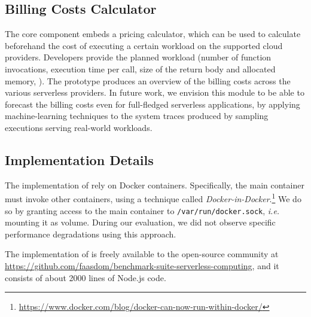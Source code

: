 
\subsection{Billing Costs Calculator}\label{ssec:billingcalc}

The core component embeds a pricing calculator, which can be used to calculate beforehand the cost of executing a certain workload on the supported cloud providers. 
Developers provide the planned workload (\eg number of function invocations, execution time per call, size of the return body and allocated memory, \etc).
The \sys prototype produces an overview of the billing costs across the various serverless providers.
In future work, we envision this module to be able to forecast the billing costs even for full-fledged serverless applications, by applying machine-learning techniques to the system traces produced by sampling executions serving real-world workloads.

\subsection{Implementation Details}\label{ssec:impl}
The implementation of \sys rely on Docker containers.
Specifically, the main container must invoke other containers, using a technique called \emph{Docker-in-Docker}.\footnote{\url{https://www.docker.com/blog/docker-can-now-run-within-docker/}}
We do so by granting access to the main container to \texttt{/var/run/docker.sock}, \emph{i.e.} mounting it as volume.
During our evaluation, we did not observe specific performance degradations using this approach.

The implementation of \sys is freely available to the open-source community at \url{https://github.com/faasdom/benchmark-suite-serverless-computing}, and it consists of about 2000 lines of Node.js code.